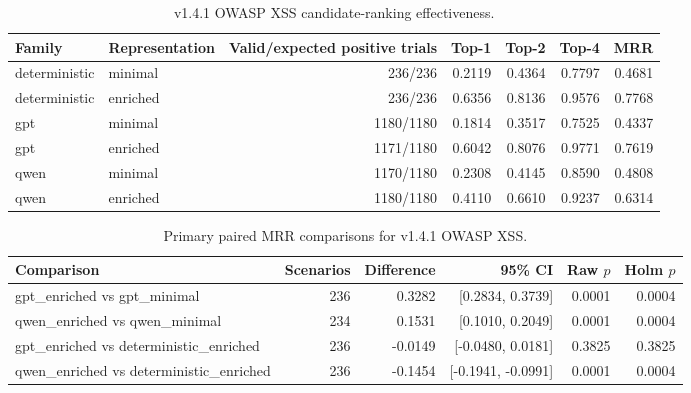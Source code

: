 \begin{table}[ht]
\centering
\caption{v1.4.1 OWASP XSS candidate-ranking effectiveness.}
\begin{tabular}{llrrrrr}
\hline
Family & Representation & Valid/expected positive trials & Top-1 & Top-2 & Top-4 & MRR \\
\hline
deterministic & minimal & 236/236 & 0.2119 & 0.4364 & 0.7797 & 0.4681 \\
deterministic & enriched & 236/236 & 0.6356 & 0.8136 & 0.9576 & 0.7768 \\
gpt & minimal & 1180/1180 & 0.1814 & 0.3517 & 0.7525 & 0.4337 \\
gpt & enriched & 1171/1180 & 0.6042 & 0.8076 & 0.9771 & 0.7619 \\
qwen & minimal & 1170/1180 & 0.2308 & 0.4145 & 0.8590 & 0.4808 \\
qwen & enriched & 1180/1180 & 0.4110 & 0.6610 & 0.9237 & 0.6314 \\
\hline
\end{tabular}
\end{table}

\begin{table}[ht]
\centering
\caption{Primary paired MRR comparisons for v1.4.1 OWASP XSS.}
\begin{tabular}{lrrrrr}
\hline
Comparison & Scenarios & Difference & 95\% CI & Raw $p$ & Holm $p$ \\
\hline
gpt\_enriched vs gpt\_minimal & 236 & 0.3282 & [0.2834, 0.3739] & 0.0001 & 0.0004 \\
qwen\_enriched vs qwen\_minimal & 234 & 0.1531 & [0.1010, 0.2049] & 0.0001 & 0.0004 \\
gpt\_enriched vs deterministic\_enriched & 236 & -0.0149 & [-0.0480, 0.0181] & 0.3825 & 0.3825 \\
qwen\_enriched vs deterministic\_enriched & 236 & -0.1454 & [-0.1941, -0.0991] & 0.0001 & 0.0004 \\
\hline
\end{tabular}
\end{table}

